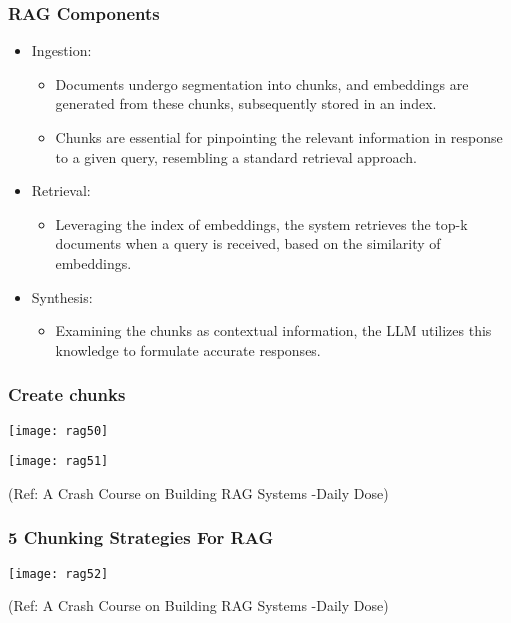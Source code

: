 \begin{frame}[fragile]\frametitle{RAG Components}


\begin{itemize}
  \item Ingestion:
	\begin{itemize}
	  \item Documents undergo segmentation into chunks, and embeddings are generated from these chunks, subsequently stored in an index.
	  \item Chunks are essential for pinpointing the relevant information in response to a given query, resembling a standard retrieval approach.
	  \end{itemize}

  \item Retrieval:
	\begin{itemize}
	  \item Leveraging the index of embeddings, the system retrieves the top-k documents when a query is received, based on the similarity of embeddings.
	\end{itemize}
	  
  \item Synthesis:
	\begin{itemize}
	  \item Examining the chunks as contextual information, the LLM utilizes this knowledge to formulate accurate responses.
	\end{itemize}

\end{itemize}

\end{frame}

\begin{frame}[fragile]\frametitle{Create chunks}



		\begin{center}
		\texttt{[image: rag50]}
		
		\texttt{[image: rag51]}
		
		\end{center}

{\tiny (Ref: A Crash Course on Building RAG Systems -Daily Dose)}


\end{frame}


\begin{frame}[fragile]\frametitle{5 Chunking Strategies For RAG}



		\begin{center}
		\texttt{[image: rag52]}
		
{\tiny (Ref: A Crash Course on Building RAG Systems -Daily Dose)}
		
	
		\end{center}



\end{frame}


